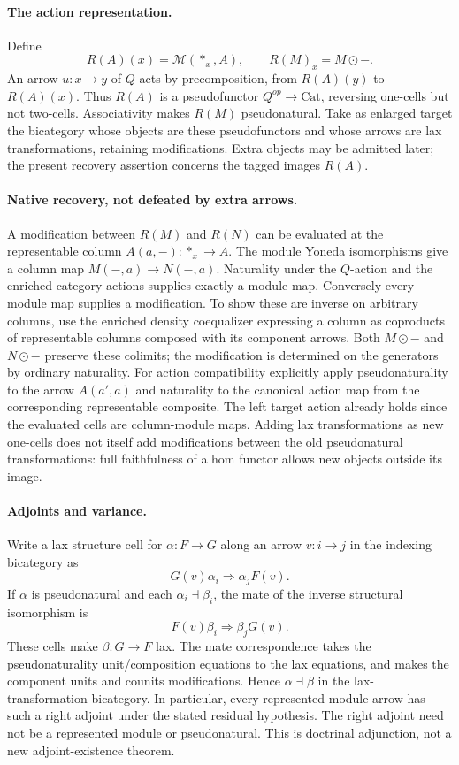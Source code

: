 \documentclass{article}
\begin{document}
\paragraph{The action representation.} Define
\[
 R(A)(x)=\mathcal M(*_x,A),\qquad R(M)_x=M\odot -.
\]
An arrow $u:x\to y$ of $Q$ acts by precomposition, from $R(A)(y)$ to $R(A)(x)$. Thus $R(A)$ is a pseudofunctor $Q^{op}\to\mathrm{Cat}$, reversing one-cells but not two-cells. Associativity makes $R(M)$ pseudonatural. Take as enlarged target the bicategory whose objects are these pseudofunctors and whose arrows are lax transformations, retaining modifications. Extra objects may be admitted later; the present recovery assertion concerns the tagged images $R(A)$.

\paragraph{Native recovery, not defeated by extra arrows.} A modification between $R(M)$ and $R(N)$ can be evaluated at the representable column $A(a,-):*_x\to A$. The module Yoneda isomorphisms give a column map $M(-,a)\to N(-,a)$. Naturality under the $Q$-action and the enriched category actions supplies exactly a module map. Conversely every module map supplies a modification. To show these are inverse on arbitrary columns, use the enriched density coequalizer expressing a column as coproducts of representable columns composed with its component arrows. Both $M\odot-$ and $N\odot-$ preserve these colimits; the modification is determined on the generators by ordinary naturality. For action compatibility explicitly apply pseudonaturality to the arrow $A(a',a)$ and naturality to the canonical action map from the corresponding representable composite. The left target action already holds since the evaluated cells are column-module maps. Adding lax transformations as new one-cells does not itself add modifications between the old pseudonatural transformations: full faithfulness of a hom functor allows new objects outside its image.

\paragraph{Adjoints and variance.} Write a lax structure cell for $\alpha:F\to G$ along an arrow $v:i\to j$ in the indexing bicategory as
\[
 G(v)\alpha_i\Longrightarrow\alpha_jF(v).
\]
If $\alpha$ is pseudonatural and each $\alpha_i\dashv\beta_i$, the mate of the inverse structural isomorphism is
\[
 F(v)\beta_i\Longrightarrow\beta_jG(v).
\]
These cells make $\beta:G\to F$ lax. The mate correspondence takes the pseudonaturality unit/composition equations to the lax equations, and makes the component units and counits modifications. Hence $\alpha\dashv\beta$ in the lax-transformation bicategory. In particular, every represented module arrow has such a right adjoint under the stated residual hypothesis. The right adjoint need not be a represented module or pseudonatural. This is doctrinal adjunction, not a new adjoint-existence theorem.
\end{document}

